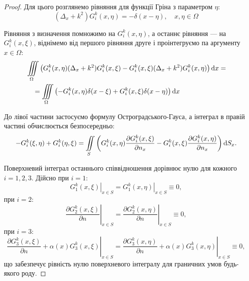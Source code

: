 \begin{proof}
	Для цього розглянемо рівняння для функції Гріна з параметром $\eta$:
	\begin{equation}
		(\Delta_x + k^2) G_i^k(x, \eta) = -\delta(x - \eta), \quad x, \eta \in \Omega
	\end{equation}

	Рівняння з визначення помножимо на $G_i^k(x, \eta)$, а останнє рівняння --- на $G_i^k(x, \xi)$, віднімемо від першого рівняння друге і проінтегруємо па аргументу $x \in \Omega$:
	\begin{equation}
		\begin{aligned}
			& \displaystyle\iiint\limits_\Omega \left( G_i^k(x, \eta) (\Delta_x + k^2) G_i^k(x, \xi) - G_i^k(x, \xi) (\Delta_x + k^2) G_i^k(x, \eta) \right) \mathop{}\!\mathrm{d} x = \\
			& \quad = \displaystyle\iiint\limits_\Omega \left( -G_i^k(x, \eta) \delta(x - \xi) + G_i^k(x, \xi) \delta(x - \eta) \right) \mathop{}\!\mathrm{d} x
		\end{aligned}
	\end{equation}


	До лівої частини застосуємо формулу Остроградського-Гауса, а інтеграл в правій частині обчислюється безпосередньо:
	\begin{equation}
		-G_i^k(\xi, \eta) + G_i^k(\eta, \xi) = \displaystyle\iint\limits_S \left( G_i^k(x, \eta) \frac{\partial G_i^k(x, \xi)}{\partial n_x} - G_i^k(x, \xi) \frac{\partial G_i^k(x, \eta)}{\partial n_x} \right) \mathop{}\!\mathrm{d} S_x.
	\end{equation}

	Поверхневий інтеграл останнього співвідношення дорівнює нулю для кожного $i = 1, 2, 3$. Дійсно при $i = 1$:
	\begin{equation}
		\left. G_1^k(x, \xi) \right|_{x \in S} = \left. G_1^k(x, \eta) \right|_{x \in S} \equiv 0,
	\end{equation}
	при $i = 2$:
	\begin{equation}
		\left. \frac{\partial G_2^k(x, \xi)}{\partial n} \right|_{x \in S} = \left. \frac{\partial G_2^k(x, \eta)}{\partial n} \right|_{x \in S} \equiv 0,
	\end{equation}
	при $i = 3$:
	\begin{equation}
		\left. \frac{\partial G_3^k(x, \xi)}{\partial n} + \alpha(x) G_3^k(x, \xi) \right|_{x \in S} = \left. \frac{\partial G_3^k(x, \eta)}{\partial n} + \alpha(x) G_3^k(x, \eta) \right|_{x \in S} \equiv 0,
	\end{equation}
	що забезпечує рівність нулю поверхневого інтегралу для граничних умов будь-якого роду.
\end{proof}

